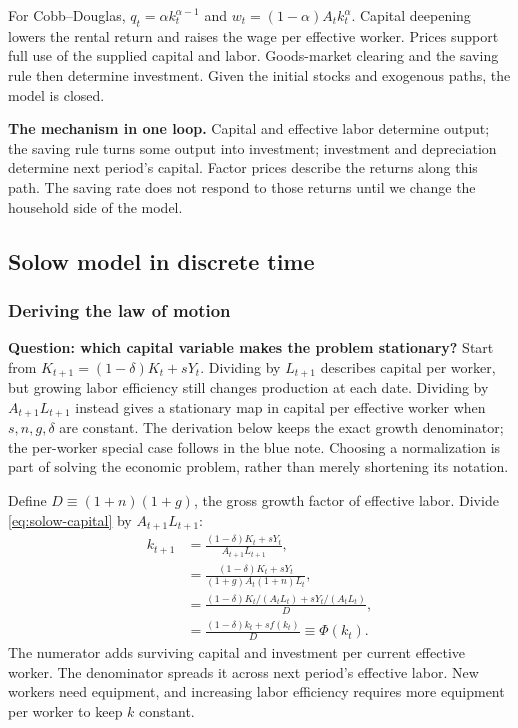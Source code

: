 For Cobb--Douglas, $q_t=\alpha k_t^{\alpha-1}$ and
$w_t=(1-\alpha)A_tk_t^\alpha$. Capital deepening lowers the rental return and
raises the wage per effective worker. Prices support full use of the supplied
capital and labor. Goods-market clearing and the saving rule then determine
investment. Given the initial stocks and exogenous paths, the model is closed.

\begin{greenblock}
\textbf{The mechanism in one loop.}
Capital and effective labor determine output; the saving rule turns some output
into investment; investment and depreciation determine next period's capital.
Factor prices describe the returns along this path. The saving rate does not
respond to those returns until we change the household side of the model.
\end{greenblock}

\subsection{Solow model in discrete time}\label{solow-model-in-discrete-time}

\subsubsection{Deriving the law of motion}

\begin{redblock}
\textbf{Question: which capital variable makes the problem stationary?}
Start from $K_{t+1}=(1-\delta)K_t+sY_t$. Dividing by $L_{t+1}$ describes
capital per worker, but growing labor efficiency still changes production
at each date. Dividing by $A_{t+1}L_{t+1}$ instead gives a stationary map in
capital per effective worker when $s,n,g,\delta$ are constant. The derivation
below keeps the exact growth denominator; the per-worker special case follows
in the blue note. Choosing a normalization is part of solving the economic
problem, rather than merely shortening its notation.
\end{redblock}

Define $D\equiv(1+n)(1+g)$, the gross growth factor of effective labor. Divide
\eqref{eq:solow-capital} by $A_{t+1}L_{t+1}$:
\begin{align}
k_{t+1}
&=\frac{(1-\delta)K_t+sY_t}{A_{t+1}L_{t+1}},\\
&=\frac{(1-\delta)K_t+sY_t}{(1+g)A_t(1+n)L_t},\\
&=\frac{(1-\delta)K_t/(A_tL_t)+sY_t/(A_tL_t)}{D},\\
&=\frac{(1-\delta)k_t+sf(k_t)}{D}\equiv\Phi(k_t).
\label{eq:solow-discrete-map}
\end{align}
The numerator adds surviving capital and investment per current effective
worker. The denominator spreads it across next period's effective labor. New
workers need equipment, and increasing labor efficiency requires more equipment
per worker to keep $k$ constant.

